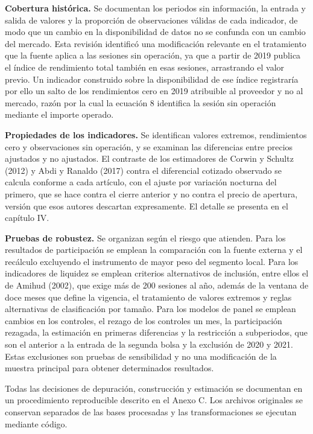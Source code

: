 \textbf{Cobertura histórica.} Se documentan los periodos sin información, la entrada y salida de valores y la proporción de observaciones válidas de cada indicador, de modo que un cambio en la disponibilidad de datos no se confunda con un cambio del mercado. Esta revisión identificó una modificación relevante en el tratamiento que la fuente aplica a las sesiones sin operación, ya que a partir de 2019 publica el índice de rendimiento total también en esas sesiones, arrastrando el valor previo. Un indicador construido sobre la disponibilidad de ese índice registraría por ello un salto de los rendimientos cero en 2019 atribuible al proveedor y no al mercado, razón por la cual la ecuación 8 identifica la sesión sin operación mediante el importe operado.

\textbf{Propiedades de los indicadores.} Se identifican valores extremos, rendimientos cero y observaciones sin operación, y se examinan las diferencias entre precios ajustados y no ajustados. El contraste de los estimadores de Corwin y Schultz (2012) y Abdi y Ranaldo (2017) contra el diferencial cotizado observado se calcula conforme a cada artículo, con el ajuste por variación nocturna del primero, que se hace contra el cierre anterior y no contra el precio de apertura, versión que esos autores descartan expresamente. El detalle se presenta en el capítulo IV.

\textbf{Pruebas de robustez.} Se organizan según el riesgo que atienden. Para los resultados de participación se emplean la comparación con la fuente externa y el recálculo excluyendo el instrumento de mayor peso del segmento local. Para los indicadores de liquidez se emplean criterios alternativos de inclusión, entre ellos el de Amihud (2002), que exige más de 200 sesiones al año, además de la ventana de doce meses que define la vigencia, el tratamiento de valores extremos y reglas alternativas de clasificación por tamaño. Para los modelos de panel se emplean cambios en los controles, el rezago de los controles un mes, la participación rezagada, la estimación en primeras diferencias y la restricción a subperiodos, que son el anterior a la entrada de la segunda bolsa y la exclusión de 2020 y 2021. Estas exclusiones son pruebas de sensibilidad y no una modificación de la muestra principal para obtener determinados resultados.

Todas las decisiones de depuración, construcción y estimación se documentan en un procedimiento reproducible descrito en el Anexo C. Los archivos originales se conservan separados de las bases procesadas y las transformaciones se ejecutan mediante código.

